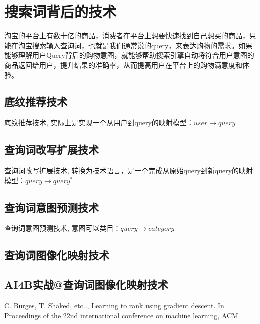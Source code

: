 
\chapter{搜索词背后的技术}
\thispagestyle{empty}

\setlength{\fboxrule}{0pt}\setlength{\fboxsep}{0cm}
\noindent\shadowbox{
\begin{tcolorbox}[arc=0mm,colback=lightblue,colframe=darkblue,title=学习目标与要求]

\end{tcolorbox}}
\setlength{\fboxrule}{1pt}\setlength{\fboxsep}{4pt} 
淘宝的平台上有数十亿的商品，消费者在平台上想要快速找到自己想买的商品，只能在淘宝搜索输入查询词，也就是我们通常说的query，来表达购物的需求。如果能够理解用户Query背后的购物意图，就能够帮助搜索引擎自动将符合用户意图的商品返回给用户，提升结果的准确率，从而提高用户在平台上的购物满意度和体验。

\section{底纹推荐技术} 
	底纹推荐技术, 实际上是实现一个从用户到query的映射模型：$user \to query$

\section{查询词改写扩展技术}
	查询词改写扩展技术, 转换为技术语言，是一个完成从原始query到新query的映射模型：$query \to query^*$
\section{查询词意图预测技术}
查询词意图预测技术, 意图可以类目：$query \to category$


\section{查询词图像化映射技术} 

\section{AI4B实战@查询词图像化映射技术} 


\begin{thebibliography}{99}
 C. Burges, T. Shaked, etc.., Learning to rank 
using gradient descent. In Proceedings of the 22nd international 
conference on machine learning, ACM
\end{thebibliography}

 
